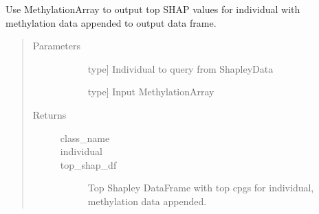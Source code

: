 \documentclass[letterpaper,10pt,english]{sphinxmanual}
\begin{document}
\begin{fulllineitems}
\begin{fulllineitems}
\label{\detokenize{index:methylnet.interpretation_classes.ShapleyDataExplorer.view_methylation}}
Use MethylationArray to output top SHAP values for individual with methylation data appended to output data frame.
\begin{quote}\begin{description}
\item[{Parameters}] \leavevmode\begin{description}
\item[{}] \leavevmode{[}type{]}
Individual to query from ShapleyData

\item[{}] \leavevmode{[}type{]}
Input MethylationArray

\end{description}

\item[{Returns}] \leavevmode\begin{description}
\item[{class\_name}] \leavevmode
\item[{individual}] \leavevmode
\item[{top\_shap\_df}] \leavevmode
Top Shapley DataFrame with top cpgs for individual, methylation data appended.

\end{description}

\end{description}\end{quote}

\end{fulllineitems}


\end{fulllineitems}

\end{document}
